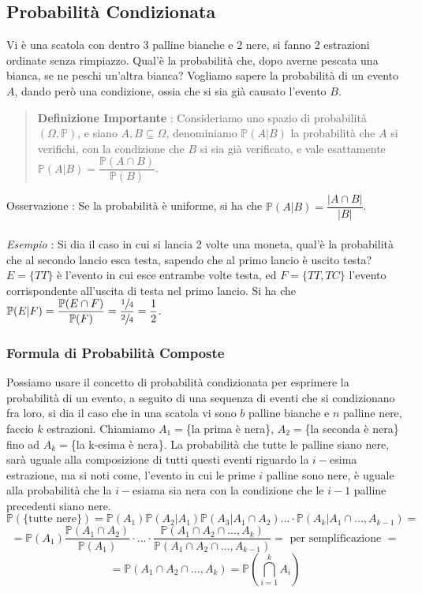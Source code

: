 \documentclass[12pt, letterpaper]{article}
\begin{document}
\subsection{Probabilità Condizionata}
Vi è una scatola con dentro 3 palline bianche e 2 nere, si fanno 2 estrazioni ordinate 
senza rimpiazzo. Qual'è la probabilità che, dopo averne pescata una bianca, se ne peschi un'altra bianca?
Vogliamo sapere la probabilità di un evento \(A\), dando però una condizione, ossia che 
si sia già causato l'evento \(B\). \begin{quote}\textbf{Definizione Importante} : 
    Consideriamo uno spazio di probabilità \((\Omega, \mathbb{P})\), e siano \(A,B\subseteq \Omega\), 
    denominiamo  \(\mathbb{P}(A|B)\) la probabilità che \(A\) si verifichi, con la condizione che 
    \(B\) si sia già verificato, e vale esattamente \(\mathbb{P}(A|B)=\dfrac{\mathbb{P}(A\cap B)}{\mathbb{P}(B)}\). 
\end{quote}
Osservazione : Se la probabilità è uniforme, si ha che  \(\mathbb{P}(A|B)=\dfrac{|A\cap B|}{|B|}\). \\
\hphantom{}\\\textit{Esempio} : Si dia il caso in cui si lancia 2 volte una moneta, qual'è la probabilità che al secondo lancio esca testa, 
sapendo che al primo lancio è uscito testa? \(E=\{TT\}\) è 
l'evento in cui esce entrambe volte testa, ed \(F=\{TT,TC\}\) l'evento corrispondente all'uscita 
di testa nel primo lancio. Si ha che \(\mathbb{P}(E|F)=\dfrac{\mathbb{P}(E\cap F)}{\mathbb{P}(F)}=\dfrac{\sfrac{1}{4}}{\sfrac{2}{4}}=\dfrac{1}{2}\).
\subsubsection{Formula di Probabilità Composte}
Possiamo usare il concetto di probabilità condizionata per esprimere la probabilità di un evento, a seguito 
di una sequenza di eventi che si condizionano fra loro, si dia il caso che in una scatola vi sono \(b\) 
palline bianche e \(n\) palline nere, faccio \(k\) estrazioni. Chiamiamo \(A_1=\)\{la prima è nera\}, 
\(A_2=\)\{la seconda è nera\} fino ad \(A_k=\)\{la k-esima è nera\}. La probabilità che tutte le palline siano 
nere, sarà uguale alla composizione di tutti questi eventi riguardo la \(i-\)esima estrazione, ma si noti come, 
l'evento in cui le prime \(i\) palline sono nere, è uguale alla probabilità che la \(i-\)esiama sia nera 
con la condizione che le \(i-1\) palline precedenti siano nere.\begin{equation}
    \mathbb{P}(\{\text{tutte nere}\})=\mathbb{P}(A_1)\mathbb{P}(A_2|A_1)\mathbb{P}(A_3|A_1\cap A_2)...\cdot\mathbb{P}(A_k|A_1\cap...,A_{k-1})=
\end{equation}\begin{equation}
    =\mathbb{P}(A_1)\dfrac{\mathbb{P}(A_1\cap A_2)}{\mathbb{P}(A_1)}\cdot...\cdot\dfrac{\mathbb{P}(A_1\cap A_2\cap...,A_{k})}{\mathbb{P}(A_1\cap A_2\cap...,A_{k-1})}=\text{ per semplificazione }=
\end{equation}
\begin{equation}
    =\mathbb{P}(A_1\cap A_2\cap...,A_{k})=\mathbb{P}(\bigcap_{i=1}^kA_i) 
\end{equation}
\end{document}

